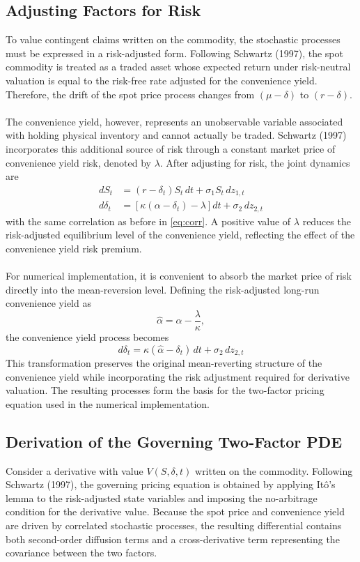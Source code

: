 \documentclass[12pt,a4paper]{article}
\begin{document}
\subsection{Adjusting Factors for Risk}

To value contingent claims written on the commodity, the stochastic processes must be expressed in a risk-adjusted form. Following Schwartz (1997), the spot commodity is treated as a traded asset whose expected return under risk-neutral valuation is equal to the risk-free rate adjusted for the convenience yield. Therefore, the drift of the spot price process changes from $(\mu-\delta)$ to $(r-\delta)$.\\\\
The convenience yield, however, represents an unobservable variable associated with holding physical inventory and cannot actually be traded. Schwartz (1997) incorporates this additional source of risk through a constant market price of convenience yield risk, denoted by $\lambda$. After adjusting for risk, the joint dynamics are
\begin{align}
    dS_t &= (r-\delta_t)S_t\,dt+\sigma_1S_t\,dz_{1,t}\label{eq:S_rn}\\
    d\delta_t &= \left[\kappa(\alpha-\delta_t)-\lambda\right]dt+\sigma_2\,dz_{2,t}\label{eq:d_rn}
\end{align}
with the same correlation as before in \eqref{eq:corr}. A positive value of $\lambda$ reduces the risk-adjusted equilibrium level of the convenience yield, reflecting the effect of the convenience yield risk premium.\\\\
For numerical implementation, it is convenient to absorb the market price of risk directly into the mean-reversion level. Defining the risk-adjusted long-run convenience yield as
\begin{equation}
    \hat{\alpha}=\alpha-\frac{\lambda}{\kappa},
\end{equation}
the convenience yield process becomes
\begin{equation}
    d\delta_t=\kappa(\hat{\alpha}-\delta_t)\,dt+\sigma_2\,dz_{2,t}\label{eq:d_rn2}
\end{equation}
This transformation preserves the original mean-reverting structure of the convenience yield while incorporating the risk adjustment required for derivative valuation. The resulting processes form the basis for the two-factor pricing equation used in the numerical implementation.

\subsection{Derivation of the Governing Two-Factor PDE}\label{sec:pde}
Consider a derivative with value $V(S,\delta,t)$ written on the commodity. Following Schwartz (1997), the governing pricing equation is obtained by applying It\^o's lemma to the risk-adjusted state variables and imposing the no-arbitrage condition for the derivative value. Because the spot price and convenience yield are driven by correlated stochastic processes, the resulting differential contains both second-order diffusion terms and a cross-derivative term representing the covariance between the two factors.
\end{document}
